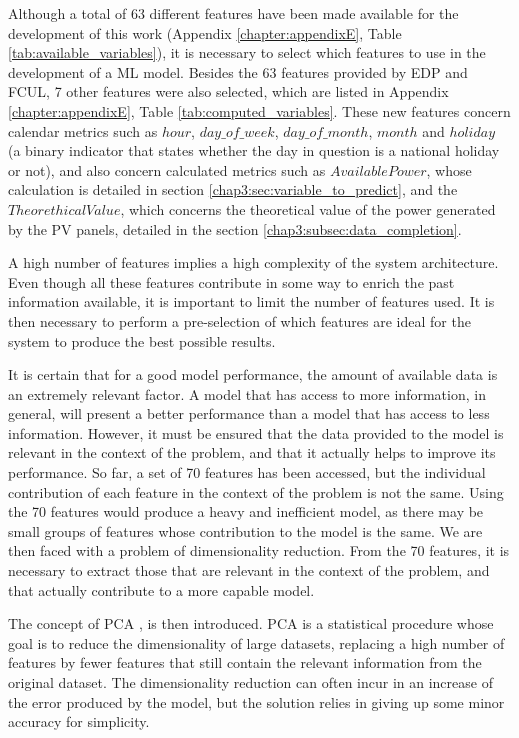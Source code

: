 Although a total of 63 different features have been made available for the development of this work (Appendix \ref{chapter:appendixE}, Table \ref{tab:available_variables}), it is necessary to select which features to use in the development of a \ac{ML} model. Besides the 63 features provided by \ac{EDP} and \ac{FCUL}, 7 other features were also selected, which are listed in Appendix \ref{chapter:appendixE}, Table \ref{tab:computed_variables}. These new features concern calendar metrics such as $hour$, $day\_of\_week$, $day\_of\_month$, $month$ and $holiday$ (a binary indicator that states whether the day in question is a national holiday or not), and also concern calculated metrics such as $AvailablePower$, whose calculation is detailed in section \ref{chap3:sec:variable_to_predict}, and the $TheorethicalValue$, which concerns the theoretical value of the power generated by the \ac{PV} panels, detailed in the section \ref{chap3:subsec:data_completion}. 

A high number of features implies a high complexity of the system architecture. Even though all these features contribute in some way to enrich the past information available, it is important to limit the number of features used. It is then necessary to perform a pre-selection of which features are ideal for the system to produce the best possible results. 

It is certain that for a good model performance, the amount of available data is an extremely relevant factor. A model that has access to more information, in general, will present a better performance than a model that has access to less information. However, it must be ensured that the data provided to the model is relevant in the context of the problem, and that it actually helps to improve its performance. So far, a set of 70 features has been accessed, but the individual contribution of each feature in the context of the problem is not the same. Using the 70 features would produce a heavy and inefficient model, as there may be small groups of features whose contribution to the model is the same. We are then faced with a problem of dimensionality reduction. From the 70 features, it is necessary to extract those that are relevant in the context of the problem, and that actually contribute to a more capable model.

The concept of \ac{PCA} \cite{pca}, is then introduced. \ac{PCA} is a statistical procedure whose goal is to reduce the dimensionality of large datasets, replacing a high number of features by fewer features that still contain the relevant information from the original dataset. The dimensionality reduction can often incur in an increase of the error produced by the model, but the solution relies in giving up some minor accuracy for simplicity.


